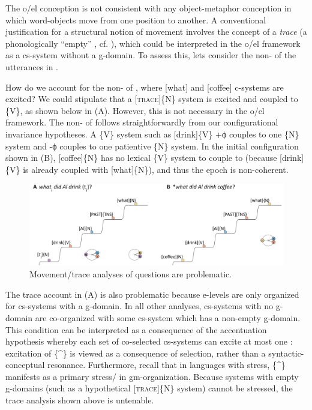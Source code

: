    The o/el conception is not consistent with any object-metaphor conception in which word-objects move from one position to another. A conventional justification for a structural notion of movement involves the concept of a \textit{trace} (a phonologically “empty” , cf. \citealt{Chomsky1965}), which could be interpreted in the o/el framework as a cs-system without a g-domain. To assess this, lets consider the non- of the utterances in .

\ea\label{ex:7:19}
  \label{ex:7:19a}
  \label{ex:7:19b}
\z
\z

  How do we account for the non- of , where [what] and [coffee] c-systems are excited?  We could stipulate that a [\textsc{trace}]\{N\} system is excited and coupled to \{V\}, as shown below in {}(A). However, this is not necessary in the o/el framework. The non- of  follows straightforwardly from our configurational invariance hypotheses. A  \{V\} system such as [drink]\{V\} +ϕ couples to one  \{N\} system and -ϕ couples to one patientive \{N\} system. In the initial configuration shown in {}(B), [coffee]\{N\} has no lexical \{V\} system to couple to (because [drink]\{V\} is already coupled with [what]\{N\}), and thus the epoch is non-coherent.

  
\begin{figure}
\includegraphics[width=\textwidth]{figures/Tilsen-img161.png}
\caption{Movement/trace analyses of questions are problematic.}
\label{fig:7:17}
\end{figure}
 

  The trace account in {}(A) is also problematic because e-levels are only organized for cs-systems with a g-domain. In all other analyses, cs-systems with no g-domain are co-organized with some cs-system which has a non-empty g-domain. This condition can be interpreted as a consequence of the accentuation hypothesis whereby each set of co-selected cs-systems can excite at most one : excitation of \{\^{}\} is viewed as a consequence of selection, rather than a syntactic-conceptual resonance. Furthermore, recall that in languages with stress, \{\^{}\} manifests as a primary stress/ in gm-organization. Because systems with empty g-domains (such as a hypothetical [\textsc{trace}]\{N\} system) cannot be stressed, the trace analysis shown above is untenable.

